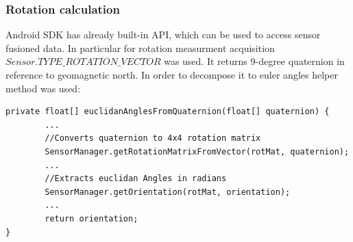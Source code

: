 \subsubsection{Rotation calculation}
Android SDK has already built-in API, which can be used to access sensor fusioned data. In particular for rotation measurment acquisition $Sensor.TYPE\_ROTATION\_VECTOR$ was used. It returns 9-degree quaternion in reference to geomagnetic north. In order to decompose it to euler angles helper method was used:
\lstset{escapechar=@,style=customjava}
\begin{lstlisting}
private float[] euclidanAnglesFromQuaternion(float[] quaternion) {
        ...
        //Converts quaternion to 4x4 rotation matrix
        SensorManager.getRotationMatrixFromVector(rotMat, quaternion);
        ...
        //Extracts euclidan Angles in radians
        SensorManager.getOrientation(rotMat, orientation);
        ...
        return orientation;
}
\end{lstlisting}
